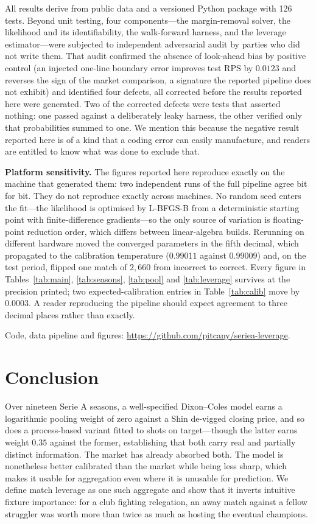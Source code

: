\documentclass[11pt]{article}
\begin{document}
All results derive from public data and a versioned Python package with 126
tests. Beyond unit testing, four components---the margin-removal solver, the
likelihood and its identifiability, the walk-forward harness, and the leverage
estimator---were subjected to independent adversarial audit by parties who did
not write them. That audit confirmed the absence of look-ahead bias by positive
control (an injected one-line boundary error improves test RPS by $0.0123$ and
reverses the sign of the market comparison, a signature the reported pipeline
does not exhibit) and identified four defects, all corrected before the results
reported here were generated. Two of the corrected defects were tests that
asserted nothing: one passed against a deliberately leaky harness, the other
verified only that probabilities summed to one. We mention this because the
negative result reported here is of a kind that a coding error can easily
manufacture, and readers are entitled to know what was done to exclude that.

\textbf{Platform sensitivity.} The figures reported here reproduce exactly on
the machine that generated them: two independent runs of the full pipeline
agree bit for bit. They do not reproduce exactly across machines. No random
seed enters the fit---the likelihood is optimised by L-BFGS-B from a
deterministic starting point with finite-difference gradients---so the only
source of variation is floating-point reduction order, which differs between
linear-algebra builds. Rerunning on different hardware moved the converged
parameters in the fifth decimal, which propagated to the calibration
temperature ($0.99011$ against $0.99009$) and, on the test period, flipped one
match of $2{,}660$ from incorrect to correct. Every figure in
Tables~\ref{tab:main}, \ref{tab:seasons}, \ref{tab:pool} and
\ref{tab:leverage} survives at the precision printed; two expected-calibration
entries in Table~\ref{tab:calib} move by $0.0003$. A reader reproducing the
pipeline should expect agreement to three decimal places rather than exactly.

Code, data pipeline and figures: \url{https://github.com/pitcany/seriea-leverage}.

\section{Conclusion}

Over nineteen Serie A seasons, a well-specified Dixon--Coles model earns a
logarithmic pooling weight of zero against a Shin de-vigged closing price, and
so does a process-based variant fitted to shots on target---though the latter
earns weight $0.35$ against the former, establishing that both carry real and
partially distinct information. The market has already absorbed both. The model
is nonetheless better calibrated than the market while being less sharp, which
makes it usable for aggregation even where it is unusable for prediction. We
define match leverage as one such aggregate and show that it inverts intuitive
fixture importance: for a club fighting relegation, an away match against a
fellow struggler was worth more than twice as much as hosting the eventual
champions.
\end{document}
